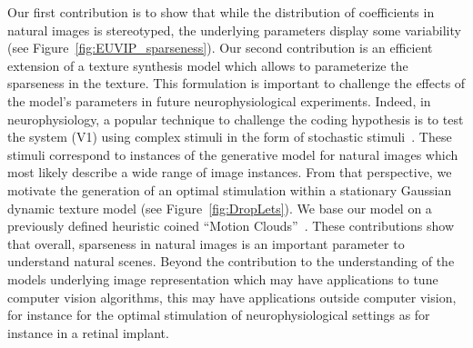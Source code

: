 \documentclass[a4paper, 10pt, twocolumns]{article}
\begin{document}
Our first contribution is to show that while the distribution of coefficients in natural images is stereotyped, the underlying parameters display some variability (see Figure~\ref{fig:EUVIP_sparseness}). Our second contribution is an efficient extension of a texture synthesis model which allows to parameterize the sparseness in the texture. This formulation is important to challenge the effects of the model's parameters in future neurophysiological experiments. Indeed, in neurophysiology, a popular technique to challenge the coding hypothesis is to test the system (V1) using complex stimuli in the form of stochastic stimuli~\citep{Touryan01}. These stimuli correspond to instances of the generative model for natural images which most likely describe a wide range of image instances. From that perspective, we motivate the generation of an optimal stimulation within a stationary Gaussian dynamic texture model (see Figure~\ref{fig:DropLets}). We base our model on a previously defined heuristic coined ``Motion Clouds''~\citep{Leon12}. These contributions show that overall, sparseness in natural images is an important parameter to understand natural scenes. Beyond the contribution to the understanding of the models underlying image representation which may have applications to tune computer vision algorithms, this may have applications outside computer vision, for instance for the optimal stimulation of neurophysiological settings as for instance in a retinal implant.
\end{document}
